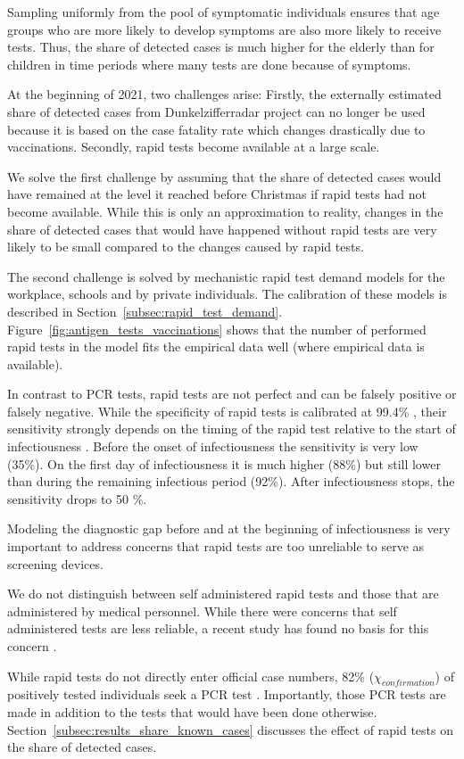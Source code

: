 Sampling uniformly from the pool of symptomatic individuals ensures that age groups who
are more likely to develop symptoms are also more likely to receive tests. Thus, the
share of detected cases is much higher for the elderly than for children in time periods
where many tests are done because of symptoms.

At the beginning of 2021, two challenges arise: Firstly, the externally estimated share
of detected cases from Dunkelzifferradar project \citep{Dunkelzifferradar2020} can no
longer be used because it is based on the case fatality rate which changes drastically
due to vaccinations. Secondly, rapid tests become available at a large scale.

We solve the first challenge by assuming that the share of detected cases would have
remained at the level it reached before Christmas if rapid tests had not become
available. While this is only an approximation to reality, changes in the share of
detected cases that would have happened without rapid tests are very likely to be small
compared to the changes caused by rapid tests.

The second challenge is solved by mechanistic rapid test demand models for the
workplace, schools and by private individuals. The calibration of these models is
described in Section~\ref{subsec:rapid_test_demand}.
Figure~\ref{fig:antigen_tests_vaccinations} shows that the number of performed rapid
tests in the model fits the empirical data well (where empirical data is available).

In contrast to PCR tests, rapid tests are not perfect and can be falsely positive or
falsely negative. While the specificity of rapid tests is calibrated at 99.4\%
\citep{Bruemmer2021}, their sensitivity strongly depends on the timing of the rapid test
relative to the start of infectiousness \citep{Smith2021}. Before the onset of
infectiousness the sensitivity is very low (35\%). On the first day of infectiousness it
is much higher (88\%) but still lower than during the remaining infectious period (92\%).
After infectiousness stops, the sensitivity drops to 50 \%.

Modeling the diagnostic gap before and at the beginning of infectiousness is very
important to address concerns that rapid tests are too unreliable to serve as screening
devices.

We do not distinguish between self administered rapid tests and those that are
administered by medical personnel. While there were concerns that self administered
tests are less reliable, a recent study has found no basis for this
concern \citep{Lindner2020}.

While rapid tests do not directly enter official case numbers, 82\%
($\chi_{confirmation}$) of positively tested individuals seek a PCR test
\citep{Betsch2021}. Importantly, those PCR tests are made in addition to the tests that
would have been done otherwise. Section~\ref{subsec:results_share_known_cases} discusses
the effect of rapid tests on the share of detected cases.

